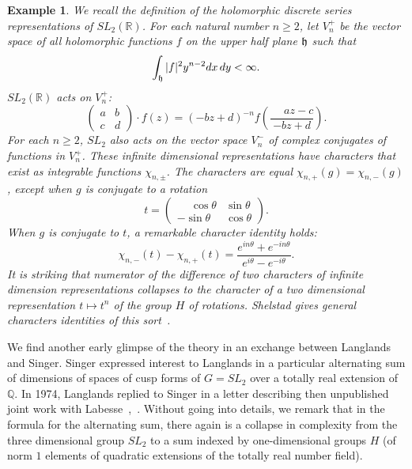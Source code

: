 \documentclass[brochure,english,12pt]{bourbaki}
\newtheorem{example}[equation]{Example}
\newcommand{\ring}[1]{\mathbb{#1}}
\begin{document}
\begin{example}\label{ex:sl2}  We recall the definition of the holomorphic discrete series representations
of $SL_2(\ring{R})$.  For each natural number $n\ge 2$, let $V^+_n$ be the vector space
of all holomorphic functions $f$ on the upper half plane ${\frak h}$ such that
\[
\int_{\frak h} |f|^2 y^{n-2} dx\, dy < \infty.
\]
$SL_2(\ring{R})$ acts on $V^+_n$:
\[
\begin{pmatrix} a & b \\ c & d \end{pmatrix} \cdot f(z) = 
(-b z + d ) ^{-n} f (\frac{\phantom{-}a z - c}{-b z + d}).
\]
For each $n\ge 2$, $SL_2$ also acts on the vector space $V^-_n$ of
complex conjugates of functions in $V^+_n$.  These infinite
dimensional representations have characters that exist as integrable
functions $\chi_{n,\pm}$.  The characters are equal
$\chi_{n,+}(g)=\chi_{n,-}(g)$, except when $g$ is conjugate to a
rotation
\[
t = \begin{pmatrix} \phantom{-}\cos\theta & \sin\theta \\ -\sin\theta & \cos\theta\end{pmatrix}.
\] 
When $g$ is conjugate to $t$, a remarkable character identity holds:
\[
\chi_{n,-}(t) - \chi_{n,+}(t) = 
\frac{e^{i n \theta} + e^{- i n \theta}}{e^{i\theta}-e^{-i\theta}}.
\]
It is striking that numerator of the difference of two characters of
infinite dimension representations collapses to the character of a two
dimensional representation $t\mapsto t^n$ of the group $H$ of
rotations.  Shelstad gives general characters identities of this
sort~\cite{XX}. %
\end{example}

  We find another early glimpse of the theory in an exchange
  between Langlands and Singer.  Singer expressed interest to
  Langlands in a particular alternating sum of dimensions of spaces of
  cusp forms of $G=SL_2$ over a totally real extension of
  $\ring{Q}$.  In 1974, Langlands replied to Singer in a letter
  describing then unpublished joint work with
  Labesse~\cite{L:singer:1974},~\cite{LL:1979}.  Without going into details, we remark
that in the formula for the
  alternating sum, there again is a collapse in complexity from the
  three dimensional group $SL_2$ to a sum indexed by one-dimensional
  groups $H$ (of norm $1$ elements of quadratic extensions of the totally real number field).
\end{document}
